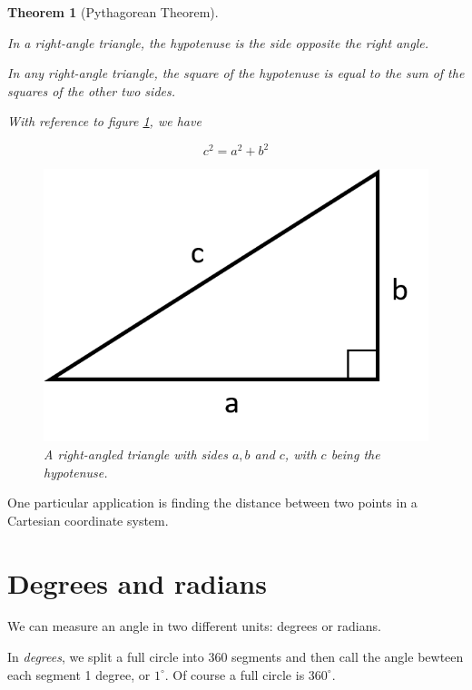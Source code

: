 \documentclass[
]{book}
\newtheorem{theorem}{Theorem}[chapter]
\theoremstyle{definition}
\theoremstyle{definition}
\theoremstyle{definition}
\theoremstyle{definition}
\theoremstyle{remark}
\begin{document}
\begin{theorem}[Pythagorean Theorem]
\protect\hypertarget{thm:pythag}{}\label{thm:pythag}

In a right-angle triangle, the \emph{hypotenuse} is the side opposite the right angle.

In any right-angle triangle, the square of the hypotenuse is equal to the sum of the squares of the other two sides.

With reference to figure \ref{fig:pythag}, we have

\[c^2=a^2+b^2\]

\begin{figure}
\includegraphics{figures/pythag} \caption{A right-angled triangle with sides $a, b$ and $c$, with $c$ being the hypotenuse.}\label{fig:pythag}
\end{figure}

\end{theorem}

One particular application is finding the distance between two points in a Cartesian coordinate system.

\hypertarget{degrees-and-radians}{%
\section{Degrees and radians}\label{degrees-and-radians}}

We can measure an angle in two different units: degrees or radians.

In \emph{degrees}, we split a full circle into 360 segments and then call the angle bewteen each segment 1 degree, or \(1^\circ\). Of course a full circle is \(360^\circ\).
\end{document}
